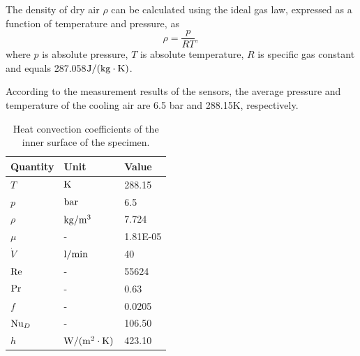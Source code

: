 \documentclass[preprint,5p,twocolumn,10pt,sort&compress]{elsarticle}
\begin{document}
The density of dry air $\rho$ can be calculated using the ideal gas law, expressed as a function of temperature and pressure, as 
\begin{equation}
\rho  = \frac{p}{{RT}},
\label{Equ:AirDensity}
\end{equation}
where
$p$ is absolute pressure,
$T$ is absolute temperature,
$R$ is specific gas constant and equals 287.058${\rm{J/(kg}} \cdot {\rm{K}})$.

According to the measurement results of the sensors, the average pressure and temperature of the cooling air are 6.5 bar and 288.15K, respectively.

\begin{table}[!ht]
\centering
  \begin{threeparttable}
  \centering
  \caption{Heat convection coefficients of the inner surface of the specimen.}
    \begin{tabular}{p{2cm}p{2cm}p{2cm}}
    \toprule
    Quantity   & Unit & Value  \\
    \midrule
    $T$   & ${\rm{K}}$ & 288.15  \\
    $p$   & ${\rm{bar}}$ & 6.5   \\
    $\rho$& ${\rm{kg/}}{{\rm{m}}^{\rm{3}}}$ & 7.724 \\
    $\mu$ & -     & 1.81E-05 \\
    ${\dot V}$ & ${\rm{l/min}}$ & 40  \\
    ${\rm{Re}}$ & -     & 55624  \\
    ${\rm{Pr}}$ & -     & 0.63  \\
    $f $ & -     & 0.0205  \\
    ${\rm{N}}{{\rm{u}}_D} $ & -     & 106.50  \\
    $h $ & ${\rm{W/(}}{{\rm{m}}^{\rm{2}}} \cdot {\rm{K)}}$ & 423.10  \\
    \bottomrule
    \end{tabular}%
    \end{threeparttable}
  \label{tab:addlabel}%
\end{table}%
\renewcommand\arraystretch{1}
\end{document}
